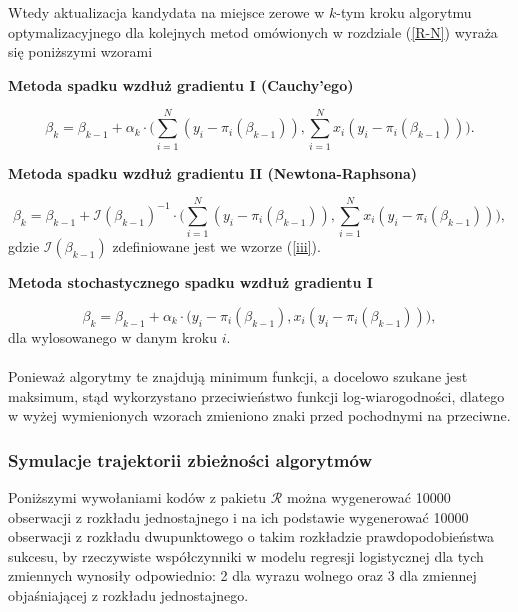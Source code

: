 Wtedy aktualizacja kandydata na miejsce zerowe w $k$-tym kroku algorytmu optymalizacyjnego dla kolejnych metod omówionych w rozdziale (\ref{R-N}) wyraża się poniższymi wzorami
\\
\begin{center}
\textbf{Metoda spadku wzdłuż gradientu I (Cauchy’ego)}
\end{center}
\begin{equation*}
\beta_{k} = \beta_{k-1} + \alpha_{k}\cdot\Big(\sum\limits_{i=1}^{N}(y_i-\pi_i(\beta_{k-1})), \sum\limits_{i=1}^{N}x_i(y_i-\pi_i(\beta_{k-1}))\Big).
\end{equation*}
\begin{center}
\textbf{Metoda spadku wzdłuż gradientu II (Newtona-Raphsona)}
\end{center}
\begin{equation*}
\beta_{k} = \beta_{k-1} + \mathscr{I}(\beta_{k-1})^{-1}\cdot\Big(\sum\limits_{i=1}^{N}(y_i-\pi_i(\beta_{k-1})), \sum\limits_{i=1}^{N}x_i(y_i-\pi_i(\beta_{k-1}))\Big),
\end{equation*}
gdzie $\mathscr{I}(\beta_{k-1})$ zdefiniowane jest we wzorze (\ref{iii}). 
\begin{center}
\textbf{Metoda stochastycznego spadku wzdłuż gradientu I}
\end{center}
\begin{equation*}
\beta_{k} = \beta_{k-1} + \alpha_{k}\cdot\Big(y_i-\pi_i(\beta_{k-1}), x_i(y_i-\pi_i(\beta_{k-1}))\Big),
\end{equation*}
dla wylosowanego w danym kroku $i$.
\\ \ \\
Ponieważ algorytmy te znajdują minimum funkcji, a docelowo szukane jest maksimum, stąd wykorzystano przeciwieństwo funkcji log-wiarogodności, dlatego w wyżej wymienionych wzorach zmieniono znaki przed pochodnymi na przeciwne.

\newpage
\subsubsection{Symulacje trajektorii zbieżności algorytmów}
Poniższymi wywołaniami kodów z pakietu $\mathcal{R}$ można wygenerować 10000 obserwacji z rozkładu jednostajnego i na ich podstawie wygenerować 10000 obserwacji z rozkładu dwupunktowego o takim rozkładzie prawdopodobieństwa sukcesu, by rzeczywiste współczynniki w modelu regresji logistycznej dla tych zmiennych wynosiły odpowiednio: 2 dla wyrazu wolnego oraz 3 dla zmiennej objaśniającej z rozkładu jednostajnego. 
\begin{Shaded}
\begin{Highlighting}[]
\StringTok{ }\NormalTok{(}\NormalTok{)}
\StringTok{ } \NormalTok{+}\StringTok{ }
\StringTok{ }\NormalTok{/(}\NormalTok{+}
\StringTok{ }\NormalTok{(}\NormalTok{,}
\end{Highlighting}
\end{Shaded}

